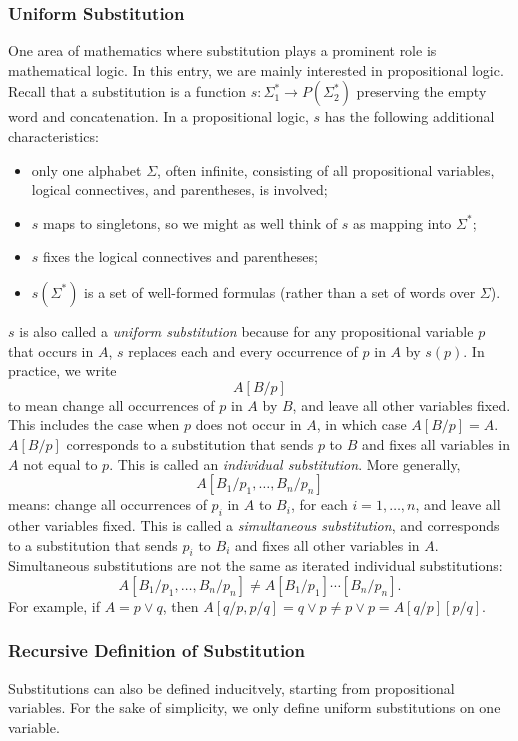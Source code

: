 \documentclass[12pt]{article}
\begin{document}
\subsubsection*{Uniform Substitution}
One area of mathematics where substitution plays a prominent role is mathematical logic.  In this entry, we are mainly interested in propositional logic.  Recall that a substitution is a function $s:\Sigma_1^* \to P(\Sigma_2^*)$ preserving the empty word and concatenation.  In a propositional logic, $s$ has the following additional characteristics:
\begin{itemize}
\item only one alphabet $\Sigma$, often infinite, consisting of all propositional variables, logical connectives, and parentheses, is involved;
\item $s$ maps to singletons, so we might as well think of $s$ as mapping into $\Sigma^*$;
\item $s$ fixes the logical connectives and parentheses;
\item $s(\Sigma^*)$ is a set of well-formed formulas (rather than a set of words over $\Sigma$).
\end{itemize}
$s$ is also called a \emph{uniform substitution} because for any propositional variable $p$ that occurs in $A$, $s$ replaces each and every occurrence of $p$ in $A$ by $s(p)$.  In practice, we write $$A[B/p]$$ to mean change all occurrences of $p$ in $A$ by $B$, and leave all other variables fixed.  This includes the case when $p$ does not occur in $A$, in which case $A[B/p]=A$.  $A[B/p]$ corresponds to a substitution that sends $p$ to $B$ and fixes all variables in $A$ not equal to $p$.  This is called an \emph{individual substitution}.  More generally,
$$A[B_1/p_1,\ldots,B_n/p_n]$$
means: change all occurrences of $p_i$ in $A$ to $B_i$, for each $i=1,\ldots,n$, and leave all other variables fixed.  This is called a \emph{simultaneous substitution}, and corresponds to a substitution that sends $p_i$ to $B_i$ and fixes all other variables in $A$.  Simultaneous substitutions are not the same as iterated individual substitutions:
$$A[B_1/p_1,\ldots, B_n/p_n] \ne A[B_1/p_1]\cdots [B_n/p_n].$$
For example, if $A=p\lor q$, then $A[q/p,p/q]= q\lor p \ne p\lor p =A[q/p][p/q]$.

\subsubsection*{Recursive Definition of Substitution}
Substitutions can also be defined inducitvely, starting from propositional variables.  For the sake of simplicity, we only define uniform substitutions on one variable.
\end{document}
